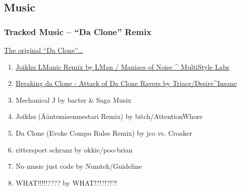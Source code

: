 \documentclass{beamer}
\begin{document}
\subsection{Music}
\begin{frame}
  \frametitle{Tracked Music -- ``Da Clone'' Remix}
  \href{https://www.youtube.com/watch?v=WnQ6012AwmA}{The original ``Da Clone''...}
  \begin{enumerate}
  \item \href{https://demozoo.org/music/191899/}{Joikhu LManic Remix by LMan / Maniacs of Noise \^{} MultiStyle Labs}
  \item \href{https://files.scene.org/view/parties/2018/evoke18/tracked_music_-_da_clone_remix/triace_-_breaking_da_clone_-_attack_of_da_clone_ravers.zip}{Breaking da Clone - Attack of Da Clone Ravers by Triace/Desire\^{}Insane}
  \item Mechanical J by bacter \& Saga Musix
  \item Joikhu (Ääntemisenmestari Remix) by bitch/AttentionWhore
  \item Da Clone (Evoke Compo Rules Remix) by jco vs. Croaker
  \item rittersport schranz by okkie/poo-brian
  \item No music just code by Numtek/Guideline
  \item WHAT!!!!!???? by WHAT!?!?!?!?!
  \end{enumerate}
\end{frame}
\end{document}
